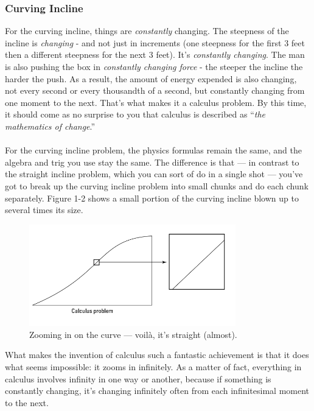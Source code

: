 \documentclass{article}
\begin{document}
\subsubsection*{\large Curving Incline}
For the curving incline, things are \textit{constantly} changing. The steepness of the incline is \textit{changing} - and not just in increments (one steepness for the first 3 feet then a different steepness for the next 3 feet).
It's \textit{constantly changing}. The man is also pushing the box in \textit{constantly changing force} - the steeper the incline the harder the push.
As a result, the amount of energy expended is also changing, not every second or every thousandth of a second, but constantly changing from one moment to the next. That’s
what makes it a calculus problem. By this time, it should come as no surprise to you that calculus is described as “\textit{the mathematics of change}.” 
\\
\\
For the curving incline problem, the physics formulas remain the same, and the
algebra and trig you use stay the same. The difference is that — in contrast to
the straight incline problem, which you can sort of do in a single shot — you’ve
got to break up the curving incline problem into small chunks and do each chunk
separately. Figure 1-2 shows a small portion of the curving incline blown up to
several times its size.

\begin{figure}[h]
    \centering
    \includegraphics[width=0.8\textwidth]{figure-1-2.png}
    \caption{Zooming in on the curve — voilà, it’s straight (almost).}
    \label{fig:02}
\end{figure}

What makes the invention of calculus such a fantastic achievement is that it
does what seems impossible: it zooms in infinitely. As a matter of fact, everything in calculus involves infinity in one way or another, because if something
is constantly changing, it’s changing infinitely often from each infinitesimal
moment to the next.
\end{document}
